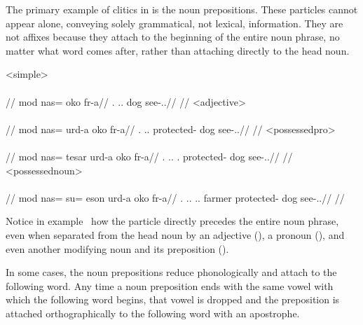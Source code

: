 The primary example of clitics in \langtvk{} is the noun prepositions. These particles cannot appear alone, conveying solely grammatical, not lexical, information. They are not affixes because they attach to the beginning of the entire noun phrase, no matter what word comes after, rather than attaching directly to the head noun.

	\a<simple>\begingl
		\glpreamble{}\\
		\\
		//
		\gla mod nas= oko fr-a//
		\glb \Fps.\Erg{} \An.\Pc.\Top{} dog see-\Ind.\Npst.\Ipfv//
		\glft{}//
	\endgl
	\a<adjective>\begingl
		\glpreamble{}\\
		\\
		//
		\gla mod nas= urd-a oko fr-a//
		\glb \Fps.\Erg{} \An.\Pc.\Top{} protected-\An{} dog see-\Ind.\Npst.\Ipfv//
		\glft{}//
	\endgl
	\a<possessedpro>\begingl
		\glpreamble{}\\
		\\
		//
		\gla mod nas= tesar urd-a oko fr-a//
		\glb \Fps.\Erg{} \An.\Pc.\Top{} \Spc.\Gen{} protected-\An{} dog see-\Ind.\Npst.\Ipfv//
		\glft{}//
	\endgl
	\a<possessednoun>\begingl
		\glpreamble{}\\
		\\
		//
		\gla mod nas= su= eson urd-a oko fr-a//
		\glb \Fps.\Erg{} \An.\Pc.\Top{} \An.\Sg.\Gen{} farmer protected-\An{} dog see-\Ind.\Npst.\Ipfv//
		\glft{}//
	\endgl
\xe

Notice in example~ how the particle   directly precedes the entire noun phrase, even when separated from the head noun by an adjective (), a pronoun (), and even another modifying noun and its preposition ().

In some cases, the noun prepositions reduce phonologically and attach to the following word. Any time a noun preposition ends with the same vowel with which the following word begins, that vowel is dropped and the preposition is attached orthographically to the following word with an apostrophe.

